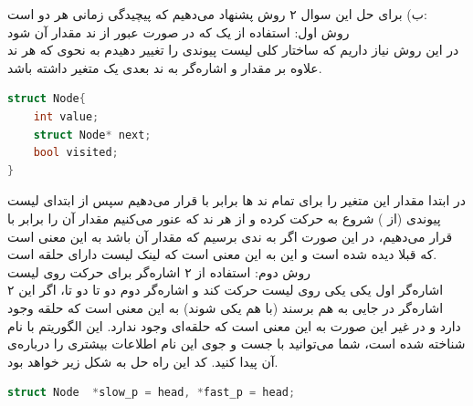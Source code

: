 \documentclass{article}
\begin{document}
\begin{enumerate}
\begin{enumerate}
		ب) برای حل این سوال ۲ روش پشنهاد می‌دهیم که پیچیدگی زمانی هر دو  است:\\
		\lr{**} روش اول: استفاده از یک  که در صورت عبور از ند مقدار آن  شود\\
		در این روش نیاز داریم که ساختار کلی لیست پیوندی را تغییر دهیدم به نحوی که هر ند علاوه بر مقدار و اشاره‌گر به ند بعدی یک متغیر  داشته باشد. 
\begin{latin}
\begin{flushright}				
\begin{lstlisting}[language=C++]
struct Node{
	int value;
	struct Node* next; 
	bool visited;
}
\end{lstlisting}
\end{flushright}								
\end{latin}
در ابتدا مقدار این متغیر را برای تمام ند ها برابر با  قرار می‌دهیم سپس از ابتدای لیست پیوندی (از ) شروع به حرکت کرده و از هر ند که عنور می‌کنیم مقدار  آن را برابر با  قرار می‌دهیم، در این صورت اگر به ندی برسیم که مقدار  آن  باشد به این معنی است که قبلا دیده شده است و این به این معنی است که لینک لیست دارای حلقه است. \\
\lr{**} روش دوم: استفاده از ۲ اشاره‌گر برای حرکت روی لیست\\
اشاره‌گر اول یکی یکی روی لیست حرکت کند و اشاره‌گر دوم دو تا دو تا، اگر این ۲ اشاره‌گر در جایی به هم برسند (با هم یکی شوند) به این معنی است که حلقه‌ وجود دارد و در غیر این صورت به این معنی است که حلقه‌ای وجود ندارد. این الگوریتم با نام  شناخته شده است، شما می‌توانید با جست و جو‌ی این نام اطلاعات بیشتری را درباره‌ی آن پیدا کنید. کد این راه حل به شکل زیر خواهد بود.
\begin{latin}
\begin{flushright}				
\begin{lstlisting}[language=C++]
struct Node  *slow_p = head, *fast_p = head;
  

\end{lstlisting}
\end{flushright}
\end{latin}
\end{enumerate}
\end{enumerate}
\end{document}
